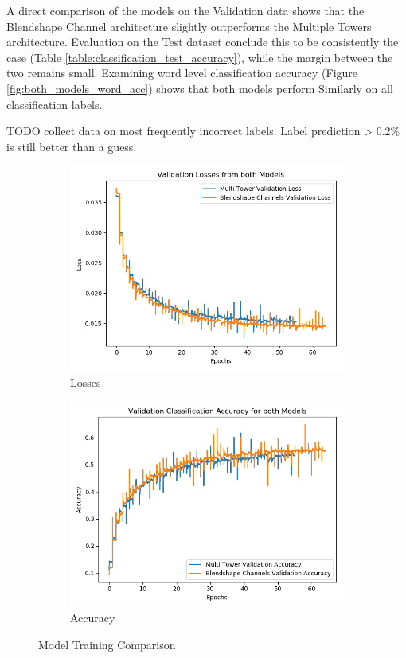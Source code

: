 A direct comparison of the models on the Validation data shows that the Blendshape Channel architecture slightly outperforms the Multiple Towers architecture.
Evaluation on the Test dataset conclude this to be consistently the case (Table \ref{table:classification_test_accuracy}), while the margin between the two remains small.
Examining word level classification accuracy (Figure \ref{fig:both_models_word_acc}) shows that both models perform Similarly on all classification labels.

TODO collect data on most frequently incorrect labels.
Label prediction > 0.2\% is still better than a guess.

\begin{figure}[h!]
    \centering
    \begin{subfigure}[b]{0.49\textwidth}
        \includegraphics[width=\textwidth]{figures/classification/both_models_val_loss.png}
        \caption{Losses}\label{fig:both_models_val_loss}
    \end{subfigure}
    \begin{subfigure}[b]{0.49\textwidth}
        \includegraphics[width=\textwidth]{figures/classification/both_models_val_acc.png}
        \caption{Accuracy}\label{fig:both_models_val_acc}
    \end{subfigure}
    \caption{Model Training Comparison}\label{fig:classification_training}
\end{figure}

